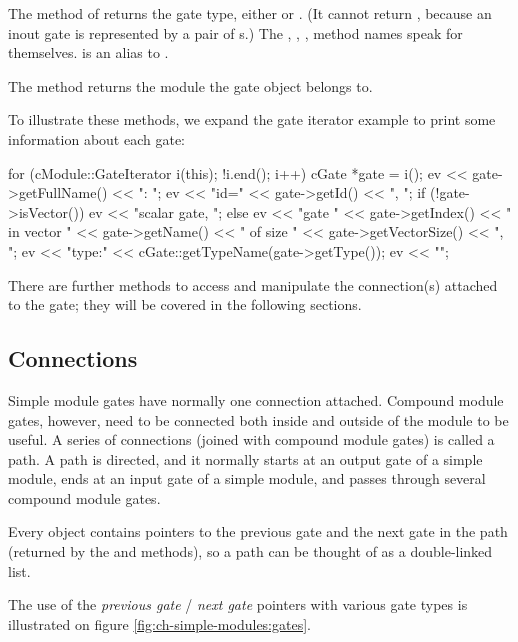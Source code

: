 The  method of  returns the gate type,
either  or . (It cannot return
, because an inout gate is represented by a pair
of s.) The , ,
,  method names speak for themselves.
 is an alias to .

The  method returns the module the gate object
belongs to.

To illustrate these methods, we expand the gate iterator example
to print some information about each gate:

\begin{cpp}
for (cModule::GateIterator i(this); !i.end(); i++) {
    cGate *gate = i();
    ev << gate->getFullName() << ": ";
    ev << "id=" << gate->getId() << ", ";
    if (!gate->isVector())
        ev << "scalar gate, ";
    else
        ev << "gate " << gate->getIndex()
           << " in vector " << gate->getName()
           << " of size " << gate->getVectorSize() << ", ";
    ev << "type:" << cGate::getTypeName(gate->getType());
    ev << "\n";
}
\end{cpp}

There are further  methods to access and manipulate
the connection(s) attached to the gate; they will be covered in the
following sections.


\subsection{Connections}
\label{sec:simple-modules:connections}

Simple module gates have normally one connection attached. Compound module
gates, however, need to be connected both inside and outside of the
module to be useful. A series of connections (joined with compound
module gates) is called a path. A path is directed, and it normally
starts at an output gate of a simple module, ends at an input gate
of a simple module, and passes through several compound module gates.

Every  object contains pointers to the previous gate
and the next gate in the path (returned by the 
and  methods), so a path can be thought of as
a double-linked list.

The use of the \textit{previous gate} / \textit{next gate} pointers
with various gate types is illustrated on figure
\ref{fig:ch-simple-modules:gates}.

